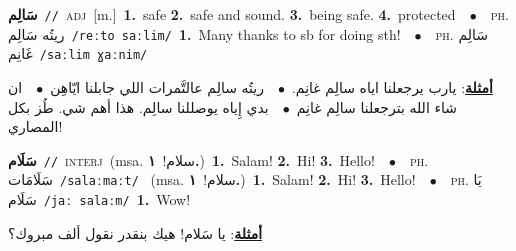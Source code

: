 \documentclass[10pt,a4paper,twoside]{article} %
\begin{document}
\begin{multicols}{2}
{\setlength\topsep{0pt}\textbf{\foreignlanguage{arabic}{سَالِم}}\ {\color{gray}\texttt{//}\color{black}}\ \textsc{adj}\ [m.]\ \textbf{1.}~safe  \textbf{2.}~safe and sound.  \textbf{3.}~being safe.  \textbf{4.}~protected\ \ $\bullet$\ \ \textsc{ph.} \color{gray} \foreignlanguage{arabic}{ريتُه سَالِم}\color{black}\ {\color{gray}\texttt{/{\sffamily reːto saːlim}/}\color{black}}\ \textbf{1.}~Many thanks to sb for doing sth!\ \ $\bullet$\ \ \textsc{ph.} \color{gray} \foreignlanguage{arabic}{سَالِم غَانِم}\color{black}\ {\color{gray}\texttt{/{\sffamily saːlim ɣaːnim}/}\color{black}}\  \begin{flushright}\color{gray}\foreignlanguage{arabic}{\textbf{\underline{\foreignlanguage{arabic}{أمثلة}}}: يارب يرجعلنا اياه سالِم غانِم.\ $\bullet$\ \  ريتُه سالِم عالتَّمرات اللي جابلنا ايّاهِن\ $\bullet$\ \  ان شاء الله بترجعلنا سالِم غانِم\ $\bullet$\ \  بدي إِياه يوصللنا سالِم. هذا أهم شي. طُز بكل المصاري!}\end{flushright}\color{black}} \vspace{2mm}

{\setlength\topsep{0pt}\textbf{\foreignlanguage{arabic}{سَلَام}}\ {\color{gray}\texttt{//}\color{black}}\ \textsc{interj}\ \color{gray}(msa. \foreignlanguage{arabic}{سلام!}~\foreignlanguage{arabic}{\textbf{١.}})\color{black}\ \textbf{1.}~Salam!  \textbf{2.}~Hi!  \textbf{3.}~Hello!\ \ $\bullet$\ \ \textsc{ph.} \color{gray} \foreignlanguage{arabic}{سَلَامَات}\color{black}\ {\color{gray}\texttt{/{\sffamily salaːmaːt}/}\color{black}}\ \color{gray} (msa. \foreignlanguage{arabic}{سلام!}~\foreignlanguage{arabic}{\textbf{١.}})\color{black}\ \textbf{1.}~Salam!  \textbf{2.}~Hi!  \textbf{3.}~Hello!\ \ $\bullet$\ \ \textsc{ph.} \color{gray} \foreignlanguage{arabic}{يَا سَلَام}\color{black}\ {\color{gray}\texttt{/{\sffamily jaː salaːm}/}\color{black}}\ \textbf{1.}~Wow!\  \begin{flushright}\color{gray}\foreignlanguage{arabic}{\textbf{\underline{\foreignlanguage{arabic}{أمثلة}}}: يا سَلام! هيك بنقدر نقول ألف مبروك؟}\end{flushright}\color{black}} \vspace{2mm}


\end{multicols}
\end{document}
